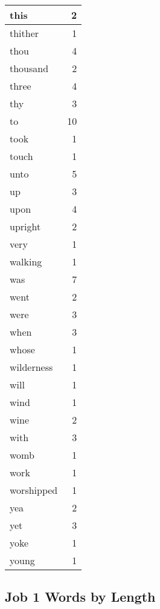 \begin{center}
\begin{longtable}{l|r}
this & 2\\ \hline 
thither & 1\\ \hline 
thou & 4\\ \hline 
thousand & 2\\ \hline 
three & 4\\ \hline 
thy & 3\\ \hline 
to & 10\\ \hline 
took & 1\\ \hline 
touch & 1\\ \hline 
unto & 5\\ \hline 
up & 3\\ \hline 
upon & 4\\ \hline 
upright & 2\\ \hline 
very & 1\\ \hline 
walking & 1\\ \hline 
was & 7\\ \hline 
went & 2\\ \hline 
were & 3\\ \hline 
when & 3\\ \hline 
whose & 1\\ \hline 
wilderness & 1\\ \hline 
will & 1\\ \hline 
wind & 1\\ \hline 
wine & 2\\ \hline 
with & 3\\ \hline 
womb & 1\\ \hline 
work & 1\\ \hline 
worshipped & 1\\ \hline 
yea & 2\\ \hline 
yet & 3\\ \hline 
yoke & 1\\ \hline 
young & 1\\ \hline 
\end{longtable}
\end{center}





\subsection{Job 1 Words by Length}


\normalsize
 
